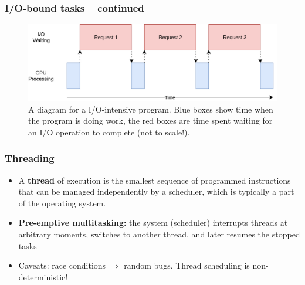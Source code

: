 \documentclass{beamer}
\begin{document}
    \begin{frame}
        \frametitle{I/O-bound tasks -- continued}

        \begin{figure}
            \includegraphics[width=\linewidth]{../figures/IOBound.png}
            \caption{A diagram for a I/O-intensive program. Blue boxes show time when the program is doing work,
            the red boxes are time spent waiting for an I/O operation to complete (not to scale!).}
        \end{figure}

    \end{frame}


    \begin{frame}
        \frametitle{Threading}

        \begin{itemize}
            \item A \textbf{thread} of execution is the smallest sequence of programmed
            instructions that can be managed independently by a scheduler, which is typically a part of the operating system.
            \item \textbf{Pre-emptive multitasking:} the system (scheduler) interrupts threads at arbitrary moments,
            switches to another thread, and later resumes the stopped tasks
            \item Caveats: race conditions $\Rightarrow$ random bugs. Thread scheduling is non-deterministic!
        \end{itemize}


    \end{frame}
\end{document}
